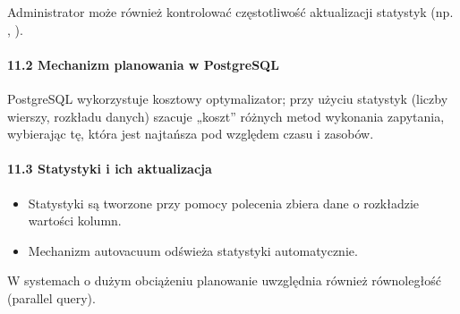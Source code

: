 \documentclass[letterpaper,10pt,polish]{sphinxmanual}
\begin{document}
\sphinxAtStartPar
Administrator może również kontrolować częstotliwość aktualizacji statystyk (np. , ).


\paragraph{11.2 Mechanizm planowania w PostgreSQL}
\label{\detokenize{rozdzial2/Konfiguracja_baz_danych/Konfiguracja_baz_danych:mechanizm-planowania-w-postgresql}}
\sphinxAtStartPar
PostgreSQL wykorzystuje kosztowy optymalizator; przy użyciu statystyk (liczby wierszy, rozkładu danych) szacuje „koszt” różnych metod wykonania zapytania, wybierając tę, która jest najtańsza pod względem czasu i zasobów.


\paragraph{11.3 Statystyki i ich aktualizacja}
\label{\detokenize{rozdzial2/Konfiguracja_baz_danych/Konfiguracja_baz_danych:statystyki-i-ich-aktualizacja}}\begin{itemize}
\item {} 
\sphinxAtStartPar
Statystyki są tworzone przy pomocy polecenia  \textendash{} zbiera dane o rozkładzie wartości kolumn.

\item {} 
\sphinxAtStartPar
Mechanizm autovacuum odświeża statystyki automatycznie.

\end{itemize}

\sphinxAtStartPar
{}

\begin{sphinxVerbatim}[commandchars=\\\{\}]
 \PYG{p}{[}\PYG{p}{]}
\end{sphinxVerbatim}

\sphinxAtStartPar
W systemach o dużym obciążeniu planowanie uwzględnia również równoległość (parallel query).
\end{document}
